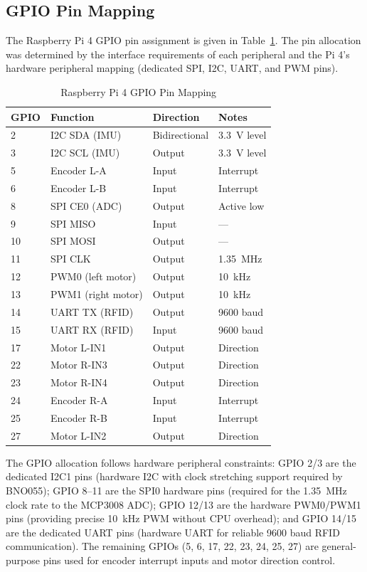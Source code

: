\documentclass[12pt,a4paper,oneside]{report}
\begin{document}
\subsection{GPIO Pin Mapping}

The Raspberry Pi 4 GPIO pin assignment is given in Table~\ref{tab:gpio}. The pin allocation was determined by the interface requirements of each peripheral and the Pi 4's hardware peripheral mapping (dedicated SPI, I2C, UART, and PWM pins).

\begin{table}[H]
\centering
\caption{Raspberry Pi 4 GPIO Pin Mapping}
\label{tab:gpio}
\begin{tabular}{p{1.5cm} p{4.5cm} p{2.5cm} p{3.5cm}}
\toprule
\textbf{GPIO} & \textbf{Function} & \textbf{Direction} & \textbf{Notes} \\
\midrule
2 & I2C SDA (IMU) & Bidirectional & 3.3~V level \\
3 & I2C SCL (IMU) & Output & 3.3~V level \\
5 & Encoder L-A & Input & Interrupt \\
6 & Encoder L-B & Input & Interrupt \\
8 & SPI CE0 (ADC) & Output & Active low \\
9 & SPI MISO & Input & --- \\
10 & SPI MOSI & Output & --- \\
11 & SPI CLK & Output & 1.35~MHz \\
12 & PWM0 (left motor) & Output & 10~kHz \\
13 & PWM1 (right motor) & Output & 10~kHz \\
14 & UART TX (RFID) & Output & 9600 baud \\
15 & UART RX (RFID) & Input & 9600 baud \\
17 & Motor L-IN1 & Output & Direction \\
22 & Motor R-IN3 & Output & Direction \\
23 & Motor R-IN4 & Output & Direction \\
24 & Encoder R-A & Input & Interrupt \\
25 & Encoder R-B & Input & Interrupt \\
27 & Motor L-IN2 & Output & Direction \\
\bottomrule
\end{tabular}
\end{table}

The GPIO allocation follows hardware peripheral constraints: GPIO 2/3 are the dedicated I2C1 pins (hardware I2C with clock stretching support required by BNO055); GPIO 8--11 are the SPI0 hardware pins (required for the 1.35~MHz clock rate to the MCP3008 ADC); GPIO 12/13 are the hardware PWM0/PWM1 pins (providing precise 10~kHz PWM without CPU overhead); and GPIO 14/15 are the dedicated UART pins (hardware UART for reliable 9600 baud RFID communication). The remaining GPIOs (5, 6, 17, 22, 23, 24, 25, 27) are general-purpose pins used for encoder interrupt inputs and motor direction control.
\end{document}
